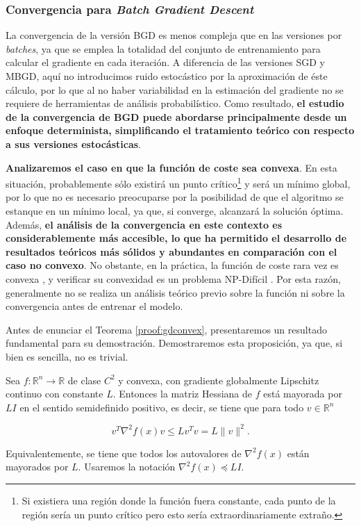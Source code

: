 \subsubsection{Convergencia para \textit{Batch Gradient Descent}}

La convergencia de la versión BGD es menos compleja que en las versiones por \textit{batches}, ya que se emplea la totalidad del conjunto de entrenamiento para calcular el gradiente en cada iteración. A diferencia de las versiones SGD y MBGD, aquí no introducimos ruido estocástico por la aproximación de éste cálculo, por lo que al no haber variabilidad en la estimación del gradiente no se requiere de herramientas de análisis probabilístico. Como resultado, \textbf{el estudio de la convergencia de BGD puede abordarse principalmente desde un enfoque determinista, simplificando el tratamiento teórico con respecto a sus versiones estocásticas}.

\textbf{Analizaremos el caso en que la función de coste sea convexa}. En esta situación, probablemente sólo existirá un punto crítico\footnote{Si existiera una región donde la función fuera constante, cada punto de la región sería un punto crítico pero esto sería extraordinariamente extraño.} y será un mínimo global, por lo que no es necesario preocuparse por la posibilidad de que el algoritmo se estanque en un mínimo local, ya que, si converge, alcanzará la solución óptima. Además, \textbf{el análisis de la convergencia en este contexto es considerablemente más accesible, lo que ha permitido el desarrollo de resultados teóricos más sólidos y abundantes en comparación con el caso no convexo}. No obstante, en la práctica, la función de coste rara vez es convexa \cite{LiVisualizing}, y verificar su convexidad es un problema NP-Difícil \cite{Ahmadi_2011_NP_Convex}. Por esta razón, generalmente no se realiza un análisis teórico previo sobre la función ni sobre la convergencia antes de entrenar el modelo.



Antes de enunciar el Teorema \ref{proof:gdconvex}, presentaremos un resultado fundamental para su demostración. Demostraremos esta proposición, ya que, si bien es sencilla, no es trivial.


\begin{proposicion}\label{prop:hess}
	Sea $f: \mathbb{R}^n \rightarrow \mathbb{R}$ de clase $C^2$ y convexa, con gradiente globalmente Lipschitz continuo con constante $L$. Entonces la matriz Hessiana de $f$ está mayorada por $LI$ en el sentido semidefinido positivo, es decir, se tiene que para todo $v \in \mathbb{R}^n$

\begin{equation*} 
	v^T\nabla ^2f(x)v \leq Lv^Tv = L \|v \|^2.
\end{equation*}

Equivalentemente, se tiene que todos los autovalores de $\nabla ^2f(x)$ están mayorados por $L$. Usaremos la notación $\nabla ^2 f(x) \preceq LI$.
\end{proposicion}


